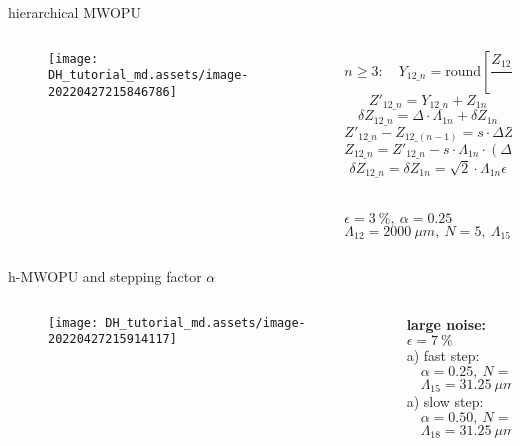 \documentclass[t, aspectratio=169]{beamer}
\begin{document}
\begin{frame}{hierarchical MWOPU}
	\begin{columns}
		\begin{column}{0.4\textwidth}
			\vspace{-5 mm}
			\begin{figure}
				\texttt{[image: DH\_tutorial\_md.assets/image-20220427215846786]}
			\end{figure}
		\end{column}
		\begin{column}{0.6\textwidth}
\[ n \ge 3:\quad Y_{12\_n}=\textrm{round}\left[\frac{Z_{12\_(n-1)}}{\Lambda_{1n}}\right]\Lambda_{1n} \]
\[ Z'_{12\_n} = Y_{12\_n} + Z_{1n} \]
\[ \delta Z_{12\_n} = \Delta\cdot\Lambda_{1n} + \delta Z_{1n} \]
\[ Z'_{12\_n} - Z_{12\_(n-1)} = s\cdot \Delta Z \]
\[ Z_{12\_n} = Z'_{12\_n} - s\cdot\Lambda_{1n}\cdot(\Delta Z \gg \delta Z_{1n}) \]
\[ \delta Z_{12\_n} = \delta Z_{1n} = \sqrt{2}\cdot\Lambda_{1n}\epsilon \]
\begin{small}
\hrulefill \\
$ \epsilon=3\ \%,\ \alpha=0.25 $ \\
$ \Lambda_{12}=2000\ \mu m,\ N=5,\ \Lambda_{15}=31.250\ \mu m $
\end{small}
		\end{column}
	\end{columns}
\end{frame}


\begin{frame}{h-MWOPU and stepping factor $\alpha$}
	\begin{columns}
		\begin{column}{0.7\textwidth}
			\vspace{-5 mm}
			\begin{figure}
				\texttt{[image: DH\_tutorial\_md.assets/image-20220427215914117]}
			\end{figure}
		\end{column}
		\begin{column}{0.3\textwidth}
\vspace{5 mm}
\textbf{large noise: } $\epsilon=7\ \% $ \\
$ $ \\
a) fast step: \\
$ \quad \alpha=0.25,\ N=5 $ \\ 
$ \quad\Lambda_{15}=31.25\ \mu m $ \\
$ $ \\
a) slow step: \\
$ \quad \alpha=0.50,\ N=8 $ \\ 
$ \quad\Lambda_{18}=31.25\ \mu m $ \\
		\end{column}
	\end{columns}
\end{frame}
\end{document}

